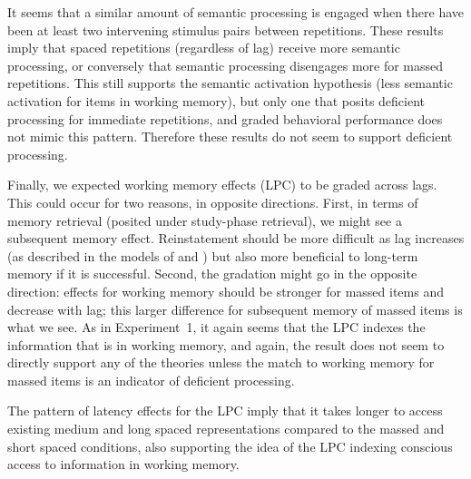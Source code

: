 It seems that a similar amount of semantic processing is engaged when there have been at least two intervening stimulus pairs between repetitions.
These results imply that spaced repetitions (regardless of lag) receive more semantic processing, or conversely that semantic processing disengages more for massed repetitions.  This still supports the  semantic activation hypothesis (less semantic activation for items in working memory), but only one that posits deficient processing for immediate repetitions, and graded behavioral performance does not mimic this pattern.  Therefore these results do not seem to support deficient processing.

Finally, we expected working memory effects (LPC) to be graded across lags.  This could occur for two reasons, in opposite directions.  First, in terms of memory retrieval (posited under study-phase retrieval), we might see a subsequent memory effect.  Reinstatement should be more difficult as lag increases (as described in the models of  and ) but also more beneficial to long-term memory if it is successful.
Second, the gradation might go in the opposite direction: effects for working memory should be stronger for massed items and decrease with lag; this larger difference for subsequent memory of massed items is what we see.
As in Experiment~1, it again seems that the LPC indexes the information that is in working memory, and again, the result does not seem to directly support any of the theories unless the match to working memory for massed items is an indicator of deficient processing.

The pattern of latency effects for the LPC imply that it takes longer to access existing medium and long spaced representations compared to the massed and short spaced conditions, also supporting the idea of the LPC indexing conscious access to information in working memory.


